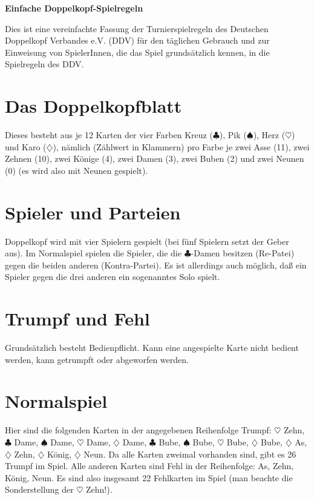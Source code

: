 \documentclass[12pt]{scrartcl}
\newcommand{\kreuz}{$\clubsuit$\xspace}
\newcommand{\pik}{$\spadesuit$\xspace}
\newcommand{\herz}{$\heartsuit$\xspace}
\newcommand{\karo}{$\diamondsuit$\xspace}
\begin{document}
\thispagestyle{empty}
\begin{titlepage}
  \begin{center}
    \LARGE \textbf{Einfache Doppelkopf-Spielregeln}
  \end{center}
\tableofcontents
\end{titlepage}

Dies ist eine vereinfachte Fassung der Turnierspielregeln des Deutschen Doppelkopf Verbandes e.V. (DDV) für den täglichen Gebrauch und zur Einweisung von SpielerInnen, die das Spiel grundsätzlich kennen, in die Spielregeln des DDV.

\section{Das Doppelkopfblatt}
Dieses besteht aus je 12 Karten der vier Farben Kreuz (\kreuz), Pik (\pik), Herz (\herz) und Karo (\karo), nämlich (Zählwert in Klammern) pro Farbe je zwei Asse (11), zwei Zehnen (10), zwei Könige (4), zwei Damen (3), zwei
Buben (2) und zwei Neunen (0) (es wird also mit Neunen gespielt).

\section{Spieler und Parteien}
Doppelkopf wird mit vier Spielern gespielt (bei fünf Spielern setzt der Geber aus). Im Normalspiel spielen die Spieler, die die \kreuz-Damen besitzen (Re-Patei) gegen die beiden anderen (Kontra-Partei). Es ist allerdings auch möglich, daß ein Spieler gegen die drei anderen ein sogenanntes Solo spielt.

\section{Trumpf und Fehl}
Grundsätzlich besteht Bedienpflicht. Kann eine angespielte Karte nicht bedient werden, kann getrumpft oder abgeworfen werden.

\section{Normalspiel}
Hier sind die folgenden Karten in der angegebenen Reihenfolge Trumpf: \herz Zehn, \kreuz Dame, \pik Dame, \herz Dame, \karo Dame, \kreuz Bube, \pik Bube, \herz Bube, \karo Bube, \karo As, \karo Zehn, \karo König, \karo Neun. Da alle Karten zweimal vorhanden sind, gibt es 26 Trumpf im Spiel. Alle anderen Karten sind Fehl in der Reihenfolge: As, Zehn, König, Neun. Es sind also insgesamt 22 Fehlkarten im Spiel (man beachte die Sonderstellung der \herz Zehn!).
\end{document}
